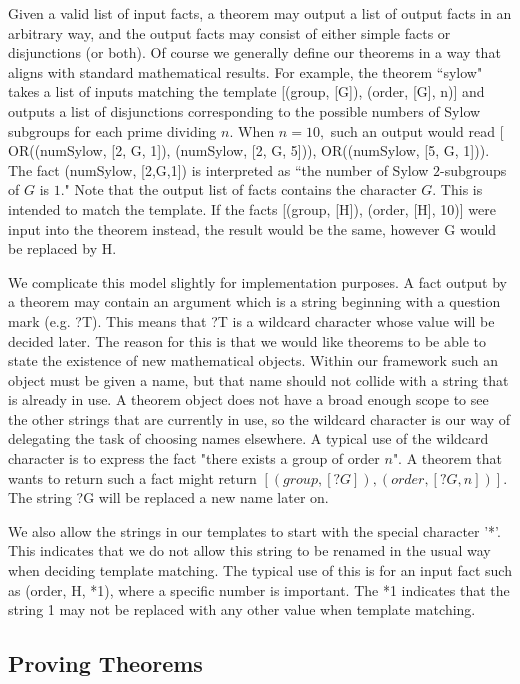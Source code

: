 \documentclass[11pt, oneside]{article}   	%
\begin{document}
Given a valid list of input facts, a theorem may output a list of output facts in an arbitrary way, and the output facts may consist of either simple facts or disjunctions (or both).  Of course we generally define our theorems in a way that aligns with standard mathematical results.  For example, the theorem ``sylow" takes a list of inputs matching the template [(group, [G]), (order, [G], n)] and outputs a list of disjunctions corresponding to the possible numbers of Sylow subgroups for each prime dividing $n$.  When $n=10,$ such an output would read [ OR((numSylow, [2, G, 1]), (numSylow, [2, G, 5])), OR((numSylow, [5, G, 1])). The fact (numSylow, [2,G,1]) is interpreted as ``the number of Sylow $2$-subgroups of $G$ is $1$."  Note that the output list of facts contains the character $G$.  This is intended to match the template.  If the facts [(group, [H]), (order, [H], 10)] were input into the theorem instead, the result would be the same, however G would be replaced by H.

We complicate this model slightly for implementation purposes.  A fact output by a theorem may contain an argument which is a string beginning with a question mark (e.g. ?T).  This means that ?T is a wildcard character whose value will be decided later.   The reason for this is that we would like theorems to be able to state the existence of new mathematical objects.  Within our framework such an object must be given a name, but that name should not collide with a string that is already in use.  A theorem object does not have a broad enough scope to see the other strings that are currently in use, so the wildcard character is our way of delegating the task of choosing names elsewhere.  A typical use of the wildcard character is to express the fact "there exists a group of order $n$".  A theorem that wants to return such a fact might return $[(group, [?G]), (order,[?G,n])].$  The string ?G will be replaced a new name later on.

We also allow the strings in our templates to start with the special character '*'. This indicates that we do not allow this string to be renamed in the usual way when deciding template matching.  The typical use of this is for an input fact such as (order, H, *1), where a specific number is important. The *1 indicates that the string 1 may not be replaced with any other value when template matching.

\subsection{Proving Theorems}
\end{document}
